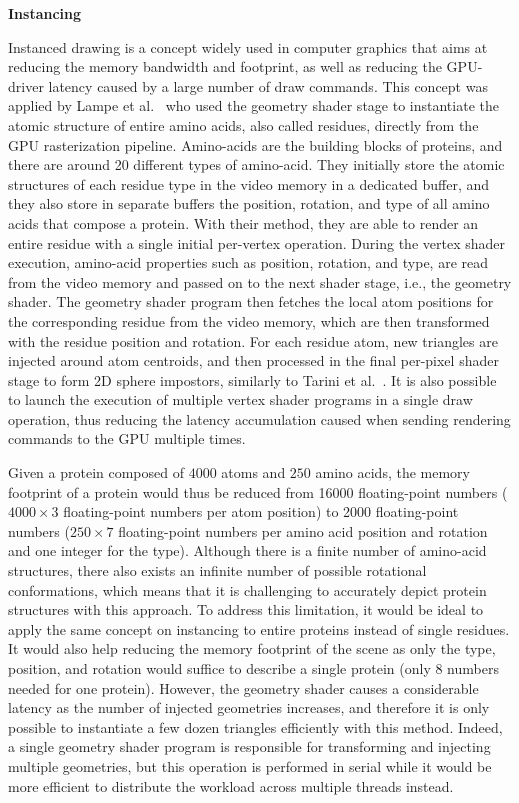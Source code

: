 

\textbf{Instancing}

Instanced drawing is a concept widely used in computer graphics that aims at reducing the memory bandwidth and footprint, as well as reducing the GPU-driver latency caused by a large number of draw commands.
This concept was applied by Lampe et al.~\cite{lampe2007two} who used the geometry shader stage to instantiate the atomic structure of entire amino acids, also called residues, directly from the GPU rasterization pipeline.
Amino-acids are the building blocks of proteins, and there are around 20 different types of amino-acid.
They initially store the atomic structures of each residue type in the video memory in a dedicated buffer, and they also store in separate buffers the position, rotation, and type of all amino acids that compose a protein.
With their method, they are able to render an entire residue with a single initial per-vertex operation.
During the vertex shader execution, amino-acid properties such as position, rotation, and type, are read from the video memory and passed on to the next shader stage, i.e., the geometry shader.
The geometry shader program then fetches the local atom positions for the corresponding residue from the video memory, which are then transformed with the residue position and rotation.
For each residue atom, new triangles are injected around atom centroids, and then processed in the final per-pixel shader stage to form 2D sphere impostors, similarly to Tarini et al.~\cite{tarini2006ambient}.
It is also possible to launch the execution of multiple vertex shader programs in a single draw operation, thus reducing the latency accumulation caused when sending rendering commands to the GPU multiple times.

Given a protein composed of $4000$ atoms and $250$ amino acids, the memory footprint of a protein would thus be reduced from 16000 floating-point numbers ($4000 \times 3$ floating-point numbers per atom position) to 2000 floating-point numbers ($250 \times 7$ floating-point numbers per amino acid position and rotation and one integer for the type).
Although there is a finite number of amino-acid structures, there also exists an infinite number of possible rotational conformations, which means that it is challenging to accurately depict protein structures with this approach.
To address this limitation, it would be ideal to apply the same concept on instancing to entire proteins instead of single residues.
It would also help reducing the memory footprint of the scene as only the type, position, and rotation would suffice to describe a single protein (only 8 numbers needed for one protein).
However, the geometry shader causes a considerable latency as the number of injected geometries increases, and therefore it is only possible to instantiate a few dozen triangles efficiently with this method.
Indeed, a single geometry shader program is responsible for transforming and injecting multiple geometries, but this operation is performed in serial while it would be more efficient to distribute the workload across multiple threads instead.


